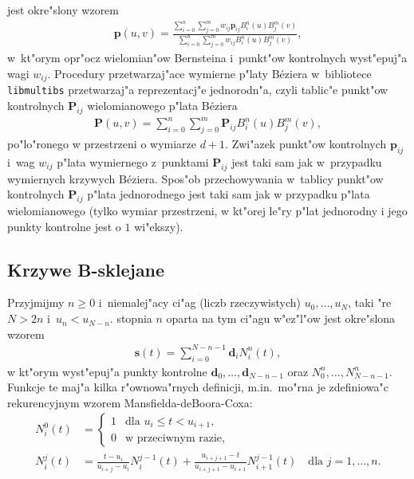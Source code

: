 \vspace{\medskipamount}
 jest okre"slony wzorem
\begin{align*}
  \bm{p}(u,v) =
    \frac{\sum_{i=0}^n\sum_{j=0}^m w_{ij}\bm{p}_{ij}B^n_i(u)B^m_j(v)}%
         {\sum_{i=0}^n\sum_{j=0}^m w_{ij}B^n_i(u)B^m_j(v)},
\end{align*}
w~kt"orym opr"ocz wielomian"ow Bernsteina i~punkt"ow kontrolnych
wyst"epuj"a wagi $w_{ij}$. Procedury przetwarzaj"ace wymierne p"laty
B\'{e}ziera w~bibliotece \texttt{libmultibs} przetwarzaj"a reprezentacj"e
jednorodn"a, czyli tablic"e punkt"ow kontrolnych $\bm{P}_{ij}$
wielomianowego p"lata B\'{e}ziera
\begin{align}
  \bm{P}(u,v) = \sum_{i=0}^n\sum_{j=0}^m\bm{P}_{ij}B^n_i(u)B^m_j(v),
\end{align}
po"lo"ronego w przestrzeni o wymiarze $d+1$. Zwi"azek punkt"ow kontrolnych
$\bm{p}_{ij}$ i~wag $w_{ij}$ p"lata wymiernego z~punktami $\bm{P}_{ij}$ jest
taki sam jak w~przypadku wymiernych krzywych B\'{e}ziera. Spos"ob
przechowywania w~tablicy punkt"ow kontrolnych $\bm{P}_{ij}$ p"lata
jednorodnego jest taki sam jak w przypadku p"lata wielomianowego (tylko
wymiar przestrzeni, w kt"orej le"ry p"lat jednorodny i jego punkty kontrolne
jest o $1$ wi"ekszy).


\subsection{\label{ssect:BSC}Krzywe B-sklejane}

Przyjmijmy $n\geq 0$ i~niemalej"acy ci"ag  (liczb
rzeczywistych) $u_0,\ldots,u_N$, taki "re $N>2n$ i~$u_n<u_{N-n}$.
 stopnia $n$ oparta na tym ci"agu w"ez"l"ow jest
okre"slona wzorem
\begin{align}\label{eq:BScurve:def}
  \bm{s}(t) = \sum_{i=0}^{N-n-1} \bm{d}_iN^n_i(t),
\end{align}
w kt"orym wyst"epuj"a punkty kontrolne $\bm{d}_0,\ldots,\bm{d}_{N-n-1}$ oraz
 $N^n_0,\ldots,N^n_{N-n-1}$. Funkcje te maj"a
kilka r"ownowa"rnych definicji, m.in.\ mo"rna je
zdefiniowa"c rekurencyjnym wzorem Mansfielda-deBoora-Coxa:
\begin{align}\label{eq:BS:basis0}
  N^0_i(t) &{}= \left\{\begin{array}{ll}1 & \mbox{dla $u_i\leq t<u_{i+1}$,} \\
    0 & \mbox{w przeciwnym razie,} \end{array}\right. \\
  \label{eq:BS:basisn}
  N^j_i(t) &{}= \frac{t-u_i}{u_{i+j}-u_i} N^{j-1}_i(t) +
    \frac{u_{i+j+1}-t}{u_{i+j+1}-u_{i+1}} N^{j-1}_{i+1}(t)\quad
    \mbox{dla $j=1,\ldots,n$}.
\end{align}

